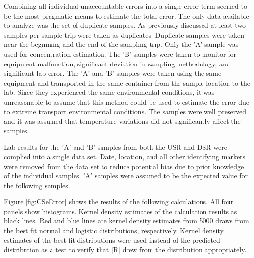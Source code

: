 \begin{linenumbers}
Combining all individual unaccountable errors into a single error term seemed to be the most pragmatic means to estimate the total error.  The only data available to analyze was the set of duplicate samples.  As previously discussed at least two samples per sample trip were taken as duplicates.  Duplicate samples were taken near the beginning and the end of the sampling trip.  Only the 'A' sample was used for concentration estimation.  The 'B' samples were taken to monitor for equipment malfunction, significant deviation in sampling methodology, and significant lab error.  The 'A' and 'B' samples were taken using the same equipment and transported in the same container from the sample location to the lab.  Since they experienced the same environmental conditions, it was unreasonable to assume that this method could be used to estimate the error due to extreme transport environmental conditions.  The samples were well preserved and it was assumed that temperature variations did not significantly affect the samples.  

Lab results for the 'A' and 'B' samples from both the USR and DSR were complied into a single data set.  Date, location, and all other identifying markers were removed from the data set to reduce potential bias due to prior knowledge of the individual samples.  'A' samples were assumed to be the expected value for the following samples.  

Figure \ref{fig:CSeError} shows the results of the following calculations.  All four panels show histograms.  Kernel density estimates of the calculation results as black lines.  Red and blue lines are kernel density estimates from 5000 draws from the best fit normal and logistic distributions, respectively.  Kernel density estimates of the best fit distributions were used instead of the predicted distribution as a test to verify that [R] drew from the distribution appropriately.


\end{linenumbers}
